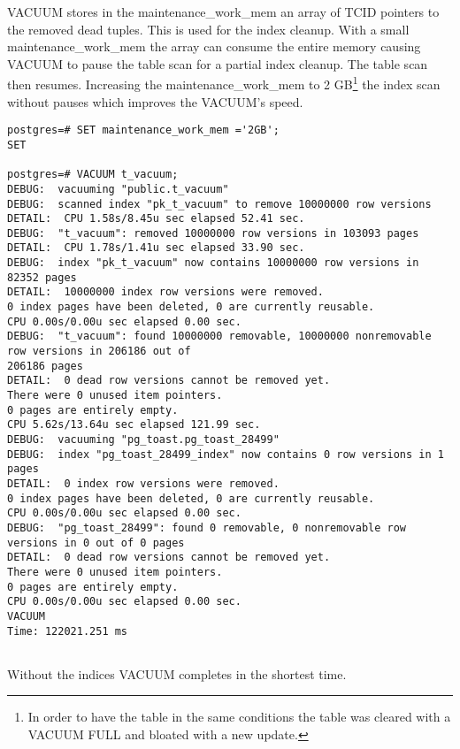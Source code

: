 VACUUM stores in the maintenance\_work\_mem an array of TCID pointers to the removed dead tuples. This 
is used for the index cleanup. With a small maintenance\_work\_mem the array can consume the entire 
memory causing VACUUM to pause the table scan for a partial index cleanup. The table scan then resumes. 
Increasing the maintenance\_work\_mem to 2 GB\footnote{In order to have the table in the same conditions the 
table was cleared with a VACUUM FULL and bloated with a new update.} the index scan without pauses 
which improves the VACUUM's speed.\newline

\begin{lstlisting}[style=pgsql]
postgres=# SET maintenance_work_mem ='2GB';
SET

postgres=# VACUUM t_vacuum;
DEBUG:  vacuuming "public.t_vacuum"
DEBUG:  scanned index "pk_t_vacuum" to remove 10000000 row versions
DETAIL:  CPU 1.58s/8.45u sec elapsed 52.41 sec.
DEBUG:  "t_vacuum": removed 10000000 row versions in 103093 pages
DETAIL:  CPU 1.78s/1.41u sec elapsed 33.90 sec.
DEBUG:  index "pk_t_vacuum" now contains 10000000 row versions in 82352 pages
DETAIL:  10000000 index row versions were removed.
0 index pages have been deleted, 0 are currently reusable.
CPU 0.00s/0.00u sec elapsed 0.00 sec.
DEBUG:  "t_vacuum": found 10000000 removable, 10000000 nonremovable row versions in 206186 out of 
206186 pages
DETAIL:  0 dead row versions cannot be removed yet.
There were 0 unused item pointers.
0 pages are entirely empty.
CPU 5.62s/13.64u sec elapsed 121.99 sec.
DEBUG:  vacuuming "pg_toast.pg_toast_28499"
DEBUG:  index "pg_toast_28499_index" now contains 0 row versions in 1 pages
DETAIL:  0 index row versions were removed.
0 index pages have been deleted, 0 are currently reusable.
CPU 0.00s/0.00u sec elapsed 0.00 sec.
DEBUG:  "pg_toast_28499": found 0 removable, 0 nonremovable row versions in 0 out of 0 pages
DETAIL:  0 dead row versions cannot be removed yet.
There were 0 unused item pointers.
0 pages are entirely empty.
CPU 0.00s/0.00u sec elapsed 0.00 sec.
VACUUM
Time: 122021.251 ms


\end{lstlisting}

Without the indices VACUUM completes in the shortest time.\newline

